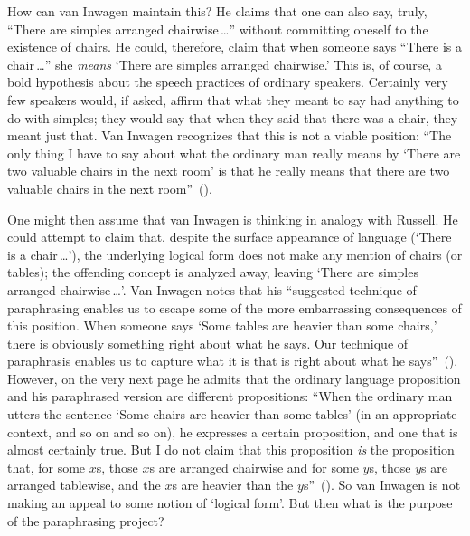 \documentclass[11pt]{standalone}
\begin{document}
\begin{spacing}{1.5}
How can van Inwagen maintain this?  He claims that one can also say,
truly, ``There are simples arranged chairwise\,\ldots '' without
committing oneself to the existence of chairs.  He could, therefore,
claim that when someone says ``There is a chair\,\ldots '' she {\em
  means} `There are simples arranged chairwise.'  This is, of course,
a bold hypothesis about the speech practices of ordinary speakers.
Certainly very few speakers would, if asked, affirm that what they
meant to say had anything to do with simples; they would say that when
they said that there was a chair, they meant just that.  Van Inwagen
recognizes that this is not a viable position: ``The only thing I have
to say about what the ordinary man really means by `There are two
valuable chairs in the next room' is that he really means that there
are two valuable chairs in the next
room''~(\citeyear[106]{inwagen1995}).

One might then assume that van Inwagen is thinking in analogy with
Russell.  He could attempt to claim that, despite the surface
appearance of language (`There is a chair\,\ldots '), the underlying
logical form does not make any mention of chairs (or tables); the
offending concept is analyzed away, leaving `There are simples
arranged chairwise\,\ldots '.  Van Inwagen notes that his ``suggested
technique of paraphrasing enables us to escape some of the more
embarrassing consequences of this position.  When someone says `Some
tables are heavier than some chairs,' there is obviously something
right about what he says.  Our technique of paraphrasis enables us to
capture what it is that is right about what he
says''~(\citeyear[111]{inwagen1995}).  However, on the very next page
he admits that the ordinary language proposition and his paraphrased
version are different propositions: ``When the ordinary man utters the
sentence `Some chairs are heavier than some tables' (in an appropriate
context, and so on and so on), he expresses a certain proposition, and
one that is almost certainly true.  But I do not claim that this
proposition {\em is} the proposition that, for some $x$s, those $x$s
are arranged chairwise and for some $y$s, those $y$s are arranged
tablewise, and the $x$s are heavier than the
$y$s''~(\citeyear[112]{inwagen1995}).  So van Inwagen is not making an
appeal to some notion of `logical form'.  But then what is the purpose
of the paraphrasing project?


\end{spacing}
\end{document}
